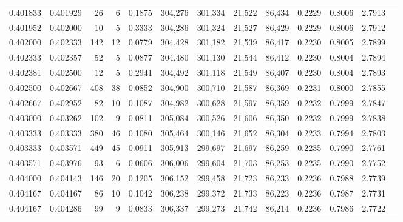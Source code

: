 \begin{tabular}{rrrrrrrrrrrrr}
0.401833 & 0.401929 &    26 &   6 &                                     0.1875 & 304,276 & 301,334 &  21,522 &  86,434 & 0.2229 & 0.8006 & 2.7913 \\
0.401952 & 0.402000 &    10 &   5 &                                     0.3333 & 304,286 & 301,324 &  21,527 &  86,429 & 0.2229 & 0.8006 & 2.7912 \\
0.402000 & 0.402333 &   142 &  12 &                                     0.0779 & 304,428 & 301,182 &  21,539 &  86,417 & 0.2230 & 0.8005 & 2.7899 \\
0.402333 & 0.402357 &    52 &   5 &                                     0.0877 & 304,480 & 301,130 &  21,544 &  86,412 & 0.2230 & 0.8004 & 2.7894 \\
0.402381 & 0.402500 &    12 &   5 &                                     0.2941 & 304,492 & 301,118 &  21,549 &  86,407 & 0.2230 & 0.8004 & 2.7893 \\
0.402500 & 0.402667 &   408 &  38 &                                     0.0852 & 304,900 & 300,710 &  21,587 &  86,369 & 0.2231 & 0.8000 & 2.7855 \\
0.402667 & 0.402952 &    82 &  10 &                                     0.1087 & 304,982 & 300,628 &  21,597 &  86,359 & 0.2232 & 0.7999 & 2.7847 \\
0.403000 & 0.403262 &   102 &   9 &                                     0.0811 & 305,084 & 300,526 &  21,606 &  86,350 & 0.2232 & 0.7999 & 2.7838 \\
0.403333 & 0.403333 &   380 &  46 &                                     0.1080 & 305,464 & 300,146 &  21,652 &  86,304 & 0.2233 & 0.7994 & 2.7803 \\
0.403333 & 0.403571 &   449 &  45 &                                     0.0911 & 305,913 & 299,697 &  21,697 &  86,259 & 0.2235 & 0.7990 & 2.7761 \\
0.403571 & 0.403976 &    93 &   6 &                                     0.0606 & 306,006 & 299,604 &  21,703 &  86,253 & 0.2235 & 0.7990 & 2.7752 \\
0.404000 & 0.404143 &   146 &  20 &                                     0.1205 & 306,152 & 299,458 &  21,723 &  86,233 & 0.2236 & 0.7988 & 2.7739 \\
0.404167 & 0.404167 &    86 &  10 &                                     0.1042 & 306,238 & 299,372 &  21,733 &  86,223 & 0.2236 & 0.7987 & 2.7731 \\
0.404167 & 0.404286 &    99 &   9 &                                     0.0833 & 306,337 & 299,273 &  21,742 &  86,214 & 0.2236 & 0.7986 & 2.7722 \\

\end{tabular}
